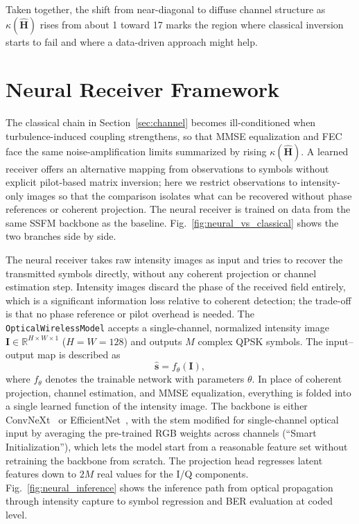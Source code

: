 \documentclass[journal]{IEEEtran}
\begin{document}
Taken together, the shift from near-diagonal to diffuse channel structure as $\kappa(\hat{\mathbf{H}})$ rises from about 1 toward 17 marks the region where classical inversion starts to fail and where a data-driven approach might help.

\section{Neural Receiver Framework}
\label{sec:neural}

The classical chain in Section~\ref{sec:channel} becomes ill-conditioned when turbulence-induced coupling strengthens, so that MMSE equalization and FEC face the same noise-amplification limits summarized by rising $\kappa(\hat{\mathbf{H}})$. A learned receiver offers an alternative mapping from observations to symbols without explicit pilot-based matrix inversion; here we restrict observations to intensity-only images so that the comparison isolates what can be recovered without phase references or coherent projection. The neural receiver is trained on data from the same SSFM backbone as the baseline. Fig.~\ref{fig:neural_vs_classical} shows the two branches side by side.


The neural receiver takes raw intensity images as input and tries to recover the transmitted symbols directly, without any coherent projection or channel estimation step. Intensity images discard the phase of the received field entirely, which is a significant information loss relative to coherent detection; the trade-off is that no phase reference or pilot overhead is needed. The \texttt{OpticalWirelessModel} accepts a single-channel, normalized intensity image $\mathbf{I} \in \mathbb{R}^{H \times W \times 1}$ ($H=W=128$) and outputs $M$ complex QPSK symbols. The input--output map is described as
\begin{equation}
\label{eq:fso_model}
    \hat{\mathbf{s}} = f_{\theta}(\mathbf{I}),
\end{equation}
where $f_{\theta}$ denotes the trainable network with parameters $\theta$. In place of coherent projection, channel estimation, and MMSE equalization, everything is folded into a single learned function of the intensity image. The backbone is either ConvNeXt~\cite{liu2022convnet} or EfficientNet~\cite{tan2019efficientnet}, with the stem modified for single-channel optical input by averaging the pre-trained RGB weights across channels (``Smart Initialization''), which lets the model start from a reasonable feature set without retraining the backbone from scratch. The projection head regresses latent features down to $2M$ real values for the I/Q components. Fig.~\ref{fig:neural_inference} shows the inference path from optical propagation through intensity capture to symbol regression and BER evaluation at coded level.
\end{document}
